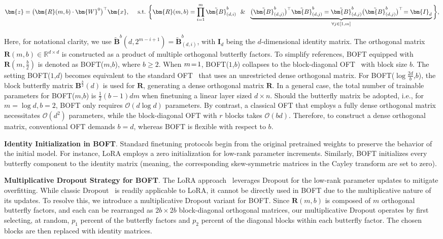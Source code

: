 \begin{equation}
    \begin{aligned}\nonumber
    \bm{z}=\big(\bm{R}(m,b)\cdot\bm{W}^0\big)^\top\bm{x},~~~~\text{s.t.}~\bigg{\{}\bm{R}(m,b)=\prod_{i=1}^m \tilde{\bm{B}}^b_{(d,i)}~~\&~~\underbrace{\big(\tilde{\bm{B}}^b_{(d,j)}\big)^\top\tilde{\bm{B}}^b_{(d,j)}=\tilde{\bm{B}}^b_{(d,j)}\big(\tilde{\bm{B}}^b_{(d,j)}\big)^\top\!=\bm{I}_d}_{\forall j\in [1, m]}\bigg{\}},
    \end{aligned}
\end{equation}

Here, for notational clarity, we use $\tilde{\bm{B}}^b(d,2^{m - i+1}) = \tilde{\bm{B}}^b_{(d,i)}$, with $\bm{I}_d$ being the $d$-dimensional identity matrix. The orthogonal matrix $\bm{R}(m,b)\in\mathbb{R}^{d\times d}$ is constructed as a product of multiple orthogonal butterfly factors. To simplify references, BOFT equipped with $\bm{R}(m,\frac{b}{2})$ is denoted as BOFT($m$,$b$), where $b\geq 2$. When $\thickmuskip=2mu \medmuskip=2mu m=1$, BOFT($1$,$b$) collapses to the block-diagonal OFT~\cite{qiu2023controlling} with block size $b$. The setting BOFT($1$,$d$) becomes equivalent to the standard OFT~\cite{qiu2023controlling} that uses an unrestricted dense orthogonal matrix. For BOFT($\log \frac{2d}{b}$,$b$), the block butterfly matrix $\bm{B}^{\frac{b}{2}}(d)$ is used for $\bm{R}$, generating a dense orthogonal matrix $\bm{R}$. In a general case, the total number of trainable parameters for BOFT($m$,$b$) is $\frac{1}{2}(b-1)dm$ when finetuning a linear layer sized $d\times n$. Should the butterfly matrix be adopted, i.e., for $m=\log d, b=2$, BOFT only requires $\mathcal{O}(d\log d)$ parameters. By contrast, a classical OFT that employs a fully dense orthogonal matrix necessitates $\mathcal{O}(d^2)$ parameters, while the block-diagonal OFT with $r$ blocks takes $\mathcal{O}(bd)$. Therefore, to construct a dense orthogonal matrix, conventional OFT demands $b=d$, whereas BOFT is flexible with respect to $b$.

\textbf{Identity Initialization in BOFT}. Standard finetuning protocols begin from the original pretrained weights to preserve the behavior of the initial model. For instance, LoRA employs a zero initialization for low-rank parameter increments. Similarly, BOFT initializes every butterfly component to the identity matrix (meaning, the corresponding skew-symmetric matrices in the Cayley transform are set to zero).

\textbf{Multiplicative Dropout Strategy for BOFT}. The LoRA approach~\cite{hulora2022} leverages Dropout for the low-rank parameter updates to mitigate overfitting. While classic Dropout~\cite{srivastava2014dropout} is readily applicable to LoRA, it cannot be directly used in BOFT due to the multiplicative nature of its updates. To resolve this, we introduce a multiplicative Dropout variant for BOFT. Since $\bm{R}(m,b)$ is composed of $m$ orthogonal butterfly factors, and each can be rearranged as $2b\times 2b$ block-diagonal orthogonal matrices, our multiplicative Dropout operates by first selecting, at random, $p_1$ percent of the butterfly factors and $p_2$ percent of the diagonal blocks within each butterfly factor. The chosen blocks are then replaced with identity matrices.

